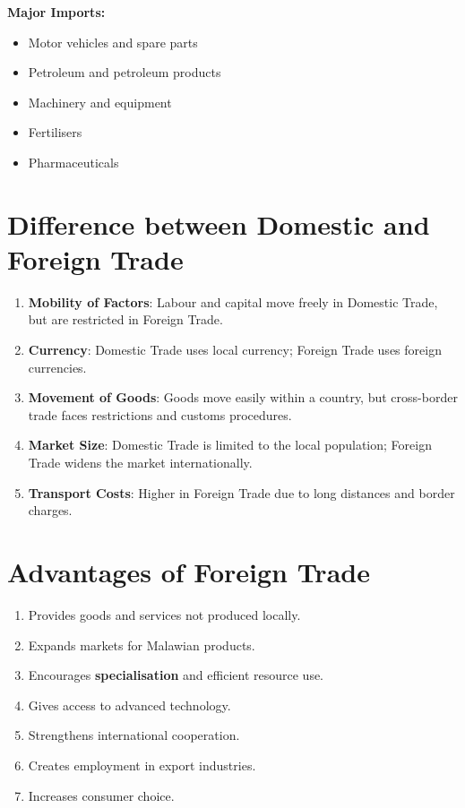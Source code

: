 \documentclass[12pt,a4paper, openany]{book}
\begin{document}
\textbf{Major Imports:}
\begin{itemize}
	\item Motor vehicles and spare parts
	\item Petroleum and petroleum products
	\item Machinery and equipment
	\item Fertilisers
	\item Pharmaceuticals
\end{itemize}

\section{Difference between Domestic and Foreign Trade}
\begin{enumerate}
	\item \textbf{Mobility of Factors}: Labour and capital move freely in Domestic Trade, but are restricted in Foreign Trade.
	\item \textbf{Currency}: Domestic Trade uses local currency; Foreign Trade uses foreign currencies.
	\item \textbf{Movement of Goods}: Goods move easily within a country, but cross-border trade faces restrictions and customs procedures.
	\item \textbf{Market Size}: Domestic Trade is limited to the local population; Foreign Trade widens the market internationally.
	\item \textbf{Transport Costs}: Higher in Foreign Trade due to long distances and border charges.
\end{enumerate}

\section{Advantages of Foreign Trade}
\begin{enumerate}
	\item Provides goods and services not produced locally.
	\item Expands markets for Malawian products.
	\item Encourages \textbf{specialisation} and efficient resource use.
	\item Gives access to advanced technology.
	\item Strengthens international cooperation.
	\item Creates employment in export industries.
	\item Increases consumer choice.
\end{enumerate}
\end{document}
